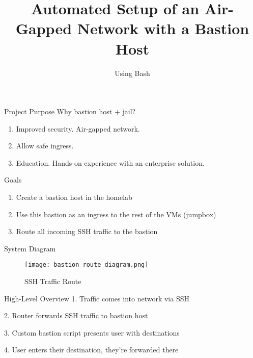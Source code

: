 \documentclass[14pt,compress,dvipsnames,aspectratio=169]{beamer} %
\title{\textbf{Automated Setup of an Air-Gapped Network with a Bastion Host}}
\author{Using Bash}
\date{}  %
\begin{document}

\begin{frame}[plain]
\titlepage
\end{frame}



\begin{frame}{Project Purpose}
    Why bastion host + jail?
    \begin{enumerate}
        \item{Improved security. Air-gapped network.} 
        \item{Allow safe ingress.}
        \item{Education. Hands-on experience with an enterprise solution.}
    \end{enumerate}
\end{frame}



\begin{frame}{Goals}
    \begin{enumerate}
        \item{Create a bastion host in the homelab} 
        \item{Use this bastion as an ingress to the rest of the VMs (jumpbox)}
        \item{Route all incoming SSH traffic to the bastion}
    \end{enumerate}
\end{frame}


\begin{frame}{System Diagram}
    \begin{figure}
        \centering
        \texttt{[image: bastion\_route\_diagram.png]}
        \caption{SSH Traffic Route}
    \end{figure}
\end{frame}





\begin{frame}{High-Level Overview}
        1. Traffic comes into network via SSH 
        \vspace{1.15cm}

        2. Router forwards SSH traffic to bastion host
        \vspace{1.15cm}

        3. Custom bastion script presents user with destinations
        \vspace{1.15cm}

        4. User enters their destination, they're forwarded there
\end{frame}
\end{document}
